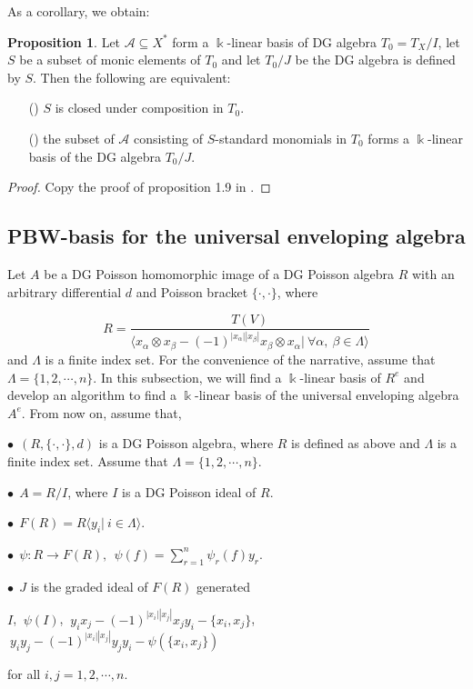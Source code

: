 \documentclass[a4paper,10pt]{amsart}
\theoremstyle{definition}
\newtheorem{prop}[theorem]{Proposition}
\theoremstyle{remark}
\numberwithin{equation}{section}
\begin{document}
As a corollary, we obtain:

\begin{prop}\label{th1}
Let $\mathcal{A}\subseteq X^*$ form a $\Bbbk$-linear basis of DG
algebra $T_0=T_X/I$, let $S$ be a subset of monic elements of $T_0$
and let $T_0/J$ be the DG algebra is defined by $S$. Then the
following are equivalent:
\begin{enumerate}
  \item[({\romannumeral {1}})] $S$ is closed under composition in $T_0$.
  \item[({\romannumeral {2}})] the subset of $\mathcal{A}$ consisting of $S$-standard
monomials in $T_0$ forms a $\Bbbk$-linear basis of the DG algebra
$T_0/J$.
\end{enumerate}
\end{prop}

\begin{proof}
Copy the proof of proposition 1.9 in \cite{KL}.
\end{proof}

\subsection{PBW-basis for the universal enveloping algebra}
Let $A$ be a DG Poisson homomorphic image of a DG Poisson algebra
$R$ with an arbitrary differential $d$ and Poisson bracket $\{\cdot, \cdot\}$,
where

$$R=\frac{T(V)}{\langle x_{\alpha}\otimes
x_{\beta}-(-1)^{|x_{\alpha}||x_{\beta}|}x_{\beta}\otimes x_{\alpha}|
~\forall \alpha, ~\beta \in\Lambda \rangle}$$
and $\Lambda$ is a finite index set. For the convenience of the
narrative, assume that $\Lambda=\{1, 2, \cdots, n\}$. In this subsection, we
will find a $\Bbbk$-linear basis of $R^{e}$ and develop an algorithm to
find a $\Bbbk$-linear basis of the universal enveloping algebra
$A^{e}$. From now on, assume that,
\newline

 $\bullet ~~(R, \{\cdot, \cdot\}, d)$ is a DG Poisson algebra, where $R$ is
 defined as above and $\Lambda$ is a finite index set. Assume that
 $\Lambda=\{1, 2, \cdots, n\}$.

 $\bullet ~~A=R/I$, where $I$ is a DG Poisson ideal of $R$.

 $\bullet ~~F(R)=R\langle y_i | ~i\in \Lambda \rangle$.

 $\bullet ~~\psi: R\rightarrow F(R), ~~\psi(f)=\sum_{r=1}^n\psi_r(f)y_r$.

 $\bullet ~~J$ is the graded ideal of $F(R)$ generated
\begin{center}
 $I$, $~\psi(I)$, $~y_ix_j-(-1)^{|x_i||x_j|}x_jy_i-\{x_i, x_j\}$, $~y_iy_j-(-1)^{|x_i||x_j|}y_jy_i-\psi(\{x_i, x_j\})$
\end{center}
for all $i, j=1, 2, \cdots, n$.
\end{document}
